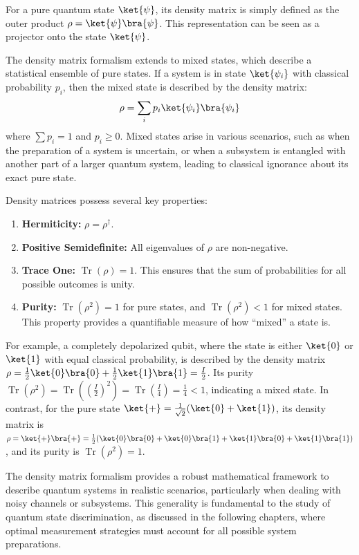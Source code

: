 For a pure quantum state $\ket{\psi}$, its density matrix is simply defined as
the outer product $\rho = \ket{\psi}\bra{\psi}$.
This representation can be seen as a projector onto the state $\ket{\psi}$.

The density matrix formalism extends to mixed states,
which describe a statistical ensemble of pure states.
If a system is in state $\ket{\psi_i}$ with classical probability $p_i$,
then the mixed state is described by the density matrix:
\begin{equation*}
    \rho = \sum_i p_i \ket{\psi_i}\bra{\psi_i}
\end{equation*}
where $\sum p_i = 1$ and $p_i \geq 0$.
Mixed states arise in various scenarios, such as when the preparation of a
system is uncertain, or when a subsystem is entangled with another part of a
larger quantum system, leading to classical ignorance about its exact pure state.

Density matrices possess several key properties:
\begin{enumerate}
    \item \textbf{Hermiticity:} $\rho = \rho^\dagger$.
    \item \textbf{Positive Semidefinite:} All eigenvalues of $\rho$ are non-negative.
    \item \textbf{Trace One:} $\operatorname{Tr}(\rho) = 1$. This ensures that the sum of probabilities for all possible outcomes is unity.
    \item \textbf{Purity:} $\operatorname{Tr}(\rho^2) = 1$ for pure states, and $\operatorname{Tr}(\rho^2) < 1$ for mixed states. This property provides a quantifiable measure of how ``mixed'' a state is.
\end{enumerate}
For example, a completely depolarized qubit, where the state is either
$\ket{0}$ or $\ket{1}$ with equal classical probability, is described by the
density matrix $\rho = \frac{1}{2}\ket{0}\bra{0} + \frac{1}{2}\ket{1}\bra{1} = \frac{I}{2}$.
Its purity $\operatorname{Tr}(\rho^2) = \operatorname{Tr}((\frac{I}{2})^2) = \operatorname{Tr}(\frac{I}{4}) = \frac{1}{4} < 1$,
indicating a mixed state.
In contrast, for the pure state $\ket{+} = \frac{1}{\sqrt{2}}(\ket{0} + \ket{1})$,
its density matrix is $\rho = \ket{+}\bra{+} = \frac{1}{2}(\ket{0}\bra{0} + \ket{0}\bra{1} + \ket{1}\bra{0} + \ket{1}\bra{1})$,
and its purity is $\operatorname{Tr}(\rho^2) = 1$.

The density matrix formalism provides a robust mathematical framework to
describe quantum systems in realistic scenarios, particularly when dealing
with noisy channels or subsystems.
This generality is fundamental to the study of quantum state discrimination,
as discussed in the following chapters, where optimal measurement strategies
must account for all possible system preparations.

